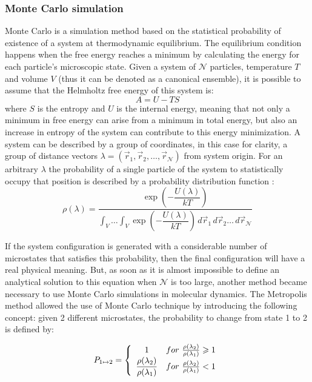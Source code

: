 \documentclass[10pt,a4paper,twoside]{article}
\begin{document}
\subsubsection{Monte Carlo simulation}
Monte Carlo is  a simulation method based on the statistical probability of existence of a system at thermodynamic equilibrium. The equilibrium condition happens when the free energy reaches a minimum by calculating the energy for each particle's microscopic state. Given a system of $ \mathcal{N}$ particles, temperature $T$ and volume $V$ (thus it can be denoted as a canonical ensemble), it is possible to assume that  the Helmholtz free energy of this system is:
\begin{equation}
A = U - TS
\label{eqn:freeE}
\end{equation}
where $S$ is the entropy and $U$ is the internal energy, meaning that not only a minimum in free energy can arise from a minimum in total energy, but also an increase in entropy of the system can contribute to this energy minimization. A system can be described by a group of coordinates, in this case for clarity, a group of distance vectors $\lambda = (	\vec{r}_1,\vec{r}_2, \ldots, \vec{r}_\mathcal{N} )$ from system origin. For an arbitrary $\lambda$ the probability of a single particle of the system to statistically occupy that position is described by a probability distribution function \cite{satoh}:
\begin{equation}
\rho(\lambda) = \dfrac{\exp{\left(-\dfrac{U(\lambda)}{kT}\right)}}{\displaystyle \int_V \dots   \int_V \exp{\left(-\dfrac{U(\lambda)}{kT}\right)}\,d\vec{r}_1 \,d\vec{r}_2 \ldots \,d\vec{r}_\mathcal{N} }
\label{eqn:rho}
\end{equation}

If the system configuration is generated with a considerable number of microstates that satisfies this probability, then the final configuration will have a real physical meaning. But, as soon as it is almost impossible to define an analytical solution to this equation when $\mathcal{N}$ is too large, another method became necessary to use Monte Carlo simulations in molecular dynamics. The Metropolis method \cite{metropolis} allowed the use of Monte Carlo technique by introducing the following concept: given 2 different microstates, the probability to change from state 1 to 2 is defined by:

\begin{equation}
 P_{1\mapsto2} = \left\{
\begin{array}{c l}     
    1 & for \ \frac{\rho(\lambda_2)}{\rho(\lambda_1)}\geqslant1\\
    \dfrac{\rho(\lambda_2)}{\rho(\lambda_1)} & for \ \frac{\rho(\lambda_2)}{\rho(\lambda_1)}<1
\end{array}\right.
\label{eqn:metrop}
\end{equation}
\end{document}
